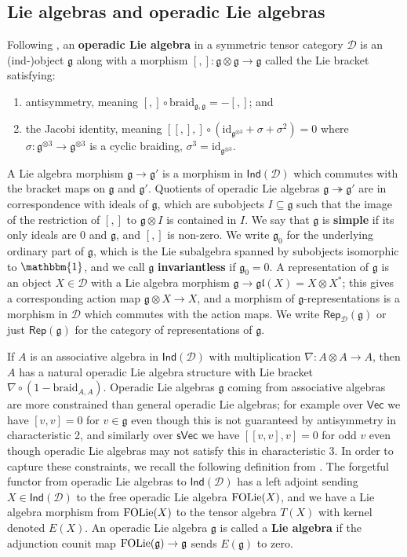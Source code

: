 \documentclass[11pt,a4paper,reqno]{amsart}
\theoremstyle{definition}
\newcommand{\cD}{\mathcal{D}}
\numberwithin{equation}{section}
\newcommand{\braid}{\mathrm{braid}}
\newcommand{\Rep}{\mathsf{Rep}}
\newcommand{\unit}{{\mathbbm{1}}}
\newcommand{\fg}{\mathfrak{g}}
\newcommand{\fgl}{\mathfrak{gl}}
\newcommand{\id}{\mathrm{id}}
\newcommand{\Vecc}{\mathsf{Vec}}
\newcommand{\sVec}{\mathsf{sVec}}
\newcommand{\Indd}{\mathsf{Ind}}
\begin{document}
\subsection{Lie algebras and operadic Lie algebras}\label{SecLieDef} Following \cite{Et}, an \textbf{operadic Lie algebra} in a symmetric tensor category $\cD$ is an (ind-)object $\fg$ along with a morphism $[,]:\fg\otimes\fg\to\fg$ called the Lie bracket satisfying:
\begin{enumerate}
\item antisymmetry, meaning $[,]\circ\braid_{\fg,\fg}=-[,]$; and
\item the Jacobi identity, meaning $[[,],]\circ(\id_{\fg^{\otimes3}}+\sigma+\sigma^2)=0$ where $\sigma:\fg^{\otimes3}\to\fg^{\otimes 3}$ is a cyclic braiding, $\sigma^3=\id_{\fg^{\otimes3}}$. 
\end{enumerate}
A Lie algebra morphism $\fg\to\fg'$ is a morphism in $\Indd(\cD)$ which commutes with the bracket maps on $\fg$ and $\fg'$. Quotients of operadic Lie algebras $\fg\twoheadrightarrow\fg'$ are in correspondence with ideals of $\fg$, which are subobjects $I\subseteq\fg$ such that the image of the restriction of $[,]$ to $\fg\otimes I$ is contained in $I$. We say that $\fg$ is \textbf{simple} if its only ideals are $0$ and $\fg$, and $[,]$ is non-zero. We write $\fg_0$ for the underlying ordinary part of $\fg$, which is the Lie subalgebra spanned by subobjects isomorphic to $\unit$, and we call $\fg$ \textbf{invariantless} if $\fg_0=0$. A representation of $\fg$ is an object $X\in\cD$ with a Lie algebra morphism $\fg\to\fgl(X)=X\otimes X^*$; this gives a corresponding action map $\fg\otimes X\to X$, and a morphism of $\fg$-representations is a morphism in $\cD$ which commutes with the action maps. We write $\Rep_\cD(\fg)$ or just $\Rep(\fg)$ for the category of representations of $\fg$.

If $A$ is an associative algebra in $\Indd(\cD)$ with multiplication $\nabla:A\otimes A\to A$, then $A$ has a natural operadic Lie algebra structure with Lie bracket $\nabla\circ(1-\braid_{A,A})$. Operadic Lie algebras $\fg$ coming from associative algebras are more constrained than general operadic Lie algebras; for example over $\Vecc$ we have $[v,v]=0$ for $v\in\fg$ even though this is not guaranteed by antisymmetry in characteristic 2, and similarly over $\sVec$ we have $[[v,v],v]=0$ for odd $v$ even though operadic Lie algebras may not satisfy this in characteristic 3. In order to capture these constraints, we recall the following definition from \cite{Et}. The forgetful functor from operadic Lie algebras to $\Indd(\cD)$ has a left adjoint sending $X\in\Indd(\cD)$ to the free operadic Lie algebra ${\rm FOLie}(X)$, and we have a Lie algebra morphism from ${\rm FOLie}(X)$ to the tensor algebra $T(X)$ with kernel denoted $E(X)$. An operadic Lie algebra $\fg$ is called a \textbf{Lie algebra} if the adjunction counit map ${\rm FOLie}(\fg)\to\fg$ sends $E(\fg)$ to zero.
\end{document}
